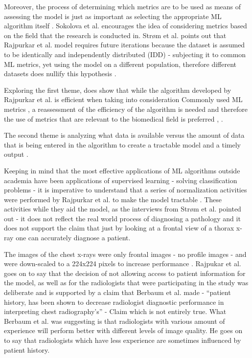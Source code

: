 \documentclass[fullpage]{article}
\begin{document}
\begin{multicols}{2}
Moreover, the process of determining which metrics are to be used as means of assessing the model is just as important as selecting the appropriate ML algorithm itself \cite{Sokolova2006}. Sokolova et al. encourages the idea of considering metrics based on the field that the research is conducted in. Strøm et al.\cite{Strom2018} points out that Rajpurkar et al.\cite{Rajpurkar} model requires future iterations because the dataset is assumed to be identically and independently distributed (IDD) - subjecting it to common ML metrics, yet using the model on a different population, therefore different datasets does nullify this hypothesis \cite{Sokolova2006}.

Exploring the first theme, does show that while the algorithm developed by Rajpurkar et al. \cite{Rajpurkar} is efficient when taking into consideration Commonly used ML metrics \cite{Sokolova2006}, a reassessment of the efficiency of the algorithm is needed and therefore the use of metrics that are relevant to the  biomedical field is preferred \cite{Sokolova2006}, \cite{Strom2018}.

The second theme is analyzing what data is available versus the amount of data  that is being entered in the algorithm to create a tractable model and a timely output \cite{Rajpurkar}.

Keeping in mind that the most effective applications of ML algorithms outside academia have been applications of supervised learning - solving classification problems \cite{Ng2016} - it is imperative to understand that a series of normalization activities were performed by Rajpurkar et al. to make the model tractable \cite{Rajpurkar}. These activities while they aid the model, as the interviews from Strøm et al. \cite{Strom2018} pointed out - it does not reflect the real world process of diagnosing a pathology and it does not support the claim that just by looking at a frontal view of a thorax x-ray one can accurately diagnose a patient.

The images of the chest x-rays were only frontal images - no profile images - and were down-scaled to a 224x224 pixels to increase performance \cite{Rajpurkar}. Rajpukar et al. goes on to say that the decision of not allowing access to patient information for the model, as well as for the radiologists that were participating in the study was deliberate and is supported by a claim that Berbaum et al. \cite{K1985} made - “patient history, has been shown to decrease radiologist diagnostic performance in interpreting chest radiography's” - Claim which is not entirely true. What Berbaum et al. \cite{K1985} was suggesting is that radiologists with various amount of experience will perform better with different levels of image quality. He goes on to say that radiologists which have less experience are sometimes influenced by patient history.


\end{multicols}
\end{document}
